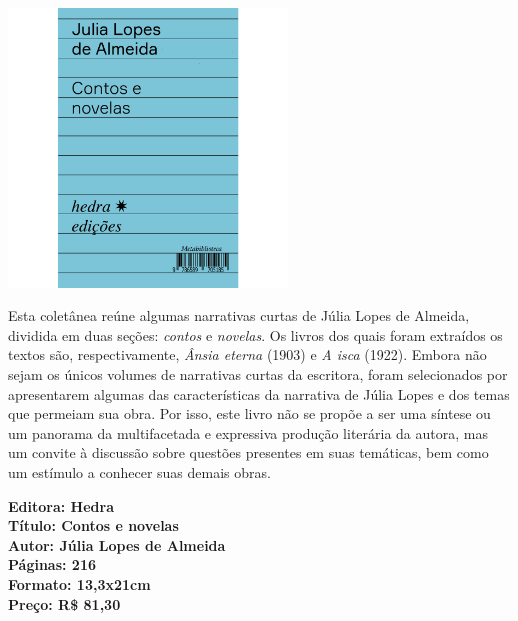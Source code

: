 \pagebreak

\begin{center}
\hspace*{.5cm}\includegraphics[width=74mm]{./grid/almeida.jpg}
\end{center}

\hspace*{-7cm}\hrulefill\hspace*{-7cm}

\medskip

\noindent{}Esta coletânea reúne algumas narrativas curtas de Júlia Lopes de Almeida, dividida em duas seções: \textit{contos} e \textit{novelas}. Os livros dos quais foram extraídos os textos são, respectivamente, \textit{Ânsia eterna} (1903) e \textit{A isca} (1922). Embora não sejam os únicos volumes de narrativas curtas da escritora, foram selecionados por apresentarem algumas das características da narrativa de Júlia Lopes e dos temas que permeiam sua obra. Por isso, este livro não se propõe a ser uma síntese ou um panorama da multifacetada e expressiva produção literária da autora, mas um convite à discussão sobre questões presentes em suas temáticas, bem como um estímulo a conhecer suas demais obras.

\vfill

\noindent\begin{minipage}[c]{.5\linewidth}
{\small\textbf{
\hspace*{-.1cm}Editora: Hedra\\
Título: Contos e novelas\\
Autor: Júlia Lopes de Almeida\\ 
Páginas: 216\\
Formato: 13,3x21cm\\
Preço: R\$ 81,30\\
}}
\end{minipage}

